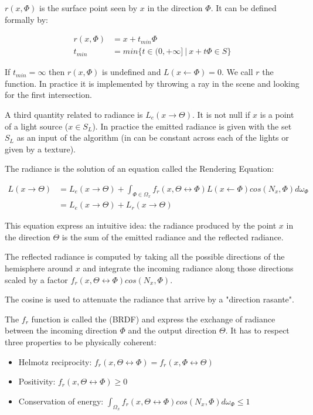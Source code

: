 $r(x, \Phi)$ is the surface point seen by $x$ in the direction $\Phi$. It can be defined formally by:

\begin{align*}
r(x, \Phi) &= x + t_{min}\Phi \\
t_{min} &= min \lbrace t \in (0, +\infty]~ |~ x + t\Phi \in S \rbrace
\end{align*}

If $t_{min} = \infty$ then $r(x, \Phi)$ is undefined and $L(x \leftarrow \Phi) = 0$. We call $r$ the  function. In practice it is implemented by throwing a ray in the scene and looking for the first intersection.

A third quantity related to radiance is  $L_e(x \rightarrow \Theta)$. It is not null if $x$ is a point of a light source ($x \in S_L$). In practice the emitted radiance is given with the set $S_L$ as an input of the algorithm (in can be constant across each of the lights or given by a texture).

The radiance is the solution of an equation called the Rendering Equation:

\begin{align*}
L(x \rightarrow \Theta) &= L_e(x \rightarrow \Theta) + \int_{\Phi \in \Omega_x} f_r(x, \Theta \leftrightarrow \Phi) L(x \leftarrow \Phi) cos(N_x, \Phi) d\omega_\Phi \\
&= L_e(x \rightarrow \Theta) + L_r(x \rightarrow \Theta)
\end{align*}

This equation express an intuitive idea: the radiance produced by the point $x$ in the direction $\Theta$ is the sum of the emitted radiance and the reflected radiance. 

The reflected radiance is computed by taking all the possible directions of the hemisphere around $x$ and integrate the incoming radiance along those directions scaled by a factor $f_r(x, \Theta \leftrightarrow \Phi) cos(N_x, \Phi)$. 

The cosine is used to attenuate the radiance that arrive by a "direction rasante". 

The $f_r$ function is called the  (BRDF) and express the exchange of radiance between the incoming direction $\Phi$ and the output direction $\Theta$. It has to respect three properties to be physically coherent:

\begin{itemize}
\item Helmotz reciprocity: $f_r(x, \Theta \leftrightarrow \Phi) = f_r(x, \Phi \leftrightarrow \Theta)$
\item Positivity: $f_r(x, \Theta \leftrightarrow \Phi) \geq 0$
\item Conservation of energy: $\int_{\Omega_x} f_r(x, \Theta \leftrightarrow \Phi) cos(N_x, \Phi) d\omega_\Phi \leq 1$
\end{itemize}

